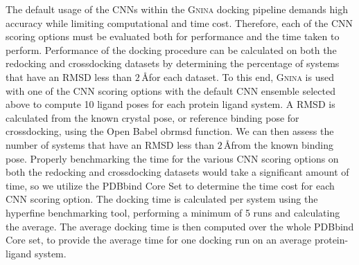 \documentclass[journal=jcisd8,manuscript=article]{achemso}
\begin{document}
The default usage of the CNNs within the \textsc{Gnina} docking pipeline demands high accuracy while limiting computational and time cost. Therefore, each of the CNN scoring options must be evaluated both for performance and the time taken to perform. Performance of the docking procedure can be calculated on both the redocking and crossdocking datasets by determining the percentage of systems that have an RMSD less than $2\,$\AA for each dataset. To this end, \textsc{Gnina} is used with one of the CNN scoring options with the default CNN ensemble selected above to compute 10 ligand poses for each protein ligand system. A RMSD is calculated from the known crystal pose, or reference binding pose for crossdocking, using the Open Babel obrmsd function. We can then assess the number of systems that have an RMSD less than $2\,$\AA from the known binding pose. Properly benchmarking the time for the various CNN scoring options on both the redocking and crossdocking datasets would take a significant amount of time, so we utilize the PDBbind Core Set to determine the time cost for each CNN scoring option. The docking time is calculated per system using the hyperfine benchmarking tool\cite{hyperfine}, performing a minimum of 5 runs and calculating the average. The average docking time is then computed over the whole PDBbind Core set, to provide the average time for one docking run on an average protein-ligand system.
\end{document}
